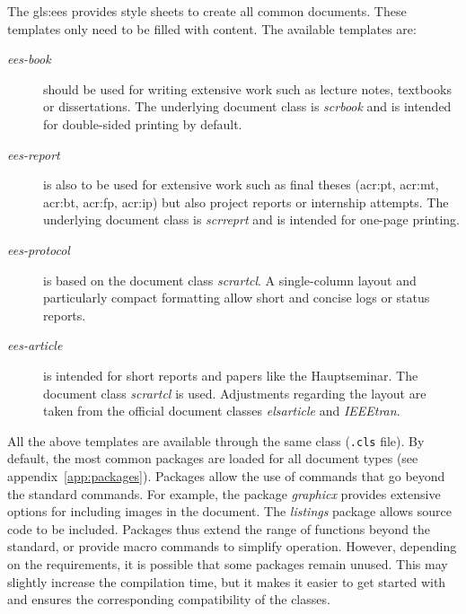 The \gls{gls:ees} provides style sheets to create all common documents. These templates only need to be filled with content. The available templates are:
\begin{description}
	\item[\textit{ees-book}] should be used for writing extensive work such as lecture notes, textbooks or dissertations. The underlying document class is \textit{scrbook} and is intended for double-sided printing by default.
	\item[\textit{ees-report}] is also to be used for extensive work such as final theses (\acs{acr:pt}, \acs{acr:mt}, \acs{acr:bt}, \acs{acr:fp}, \acs{acr:ip}) but also project reports or internship attempts. The underlying document class is \textit{scrreprt} and is intended for one-page printing.
	\item[\textit{ees-protocol}] is based on the document class \textit{scrartcl}. A single-column layout and particularly compact formatting allow short and concise logs or status reports.
	\item[\textit{ees-article}] is intended for short reports and papers like the Hauptseminar. The document class \textit{scrartcl} is used. Adjustments regarding the layout are taken from the official document classes \textit{elsarticle} and \textit{IEEEtran}. 
\end{description}


All the above templates are available through the same \Latex class (\texttt{.cls} file). By default, the most common packages are loaded for all document types (see appendix~\ref{app:packages}). Packages allow the use of commands that go beyond the standard \Latex commands. For example, the package \textit{graphicx} provides extensive options for including images in the document. The \textit{listings} package allows source code to be included. Packages thus extend the range of functions beyond the \Latex standard, or provide macro commands to simplify operation. However, depending on the requirements, it is possible that some packages remain unused. This may slightly increase the compilation time, but it makes it easier to get started with \Latex and ensures the corresponding compatibility of the classes. 




